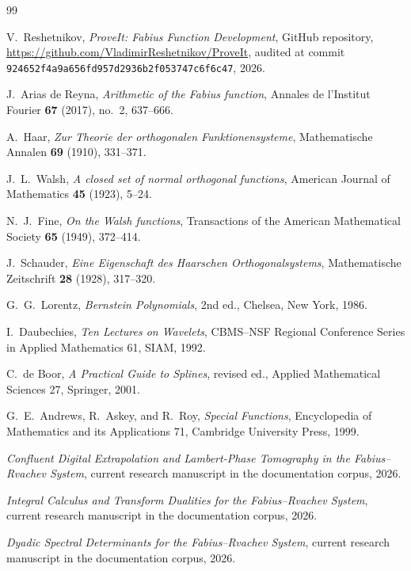 \documentclass[11pt]{article}
\theoremstyle{definition}
\theoremstyle{remark}
\begin{document}
\begin{thebibliography}{99}

V.~Reshetnikov,
\emph{ProveIt: Fabius Function Development}, GitHub repository,
\url{https://github.com/VladimirReshetnikov/ProveIt}, audited at commit
\nolinkurl{924652f4a9a656fd957d2936b2f053747c6f6c47}, 2026.

J.~Arias de Reyna,
\emph{Arithmetic of the Fabius function},
Annales de l'Institut Fourier \textbf{67} (2017), no.~2, 637--666.

A.~Haar,
\emph{Zur Theorie der orthogonalen Funktionensysteme},
Mathematische Annalen \textbf{69} (1910), 331--371.

J.~L.~Walsh,
\emph{A closed set of normal orthogonal functions},
American Journal of Mathematics \textbf{45} (1923), 5--24.

N.~J.~Fine,
\emph{On the Walsh functions},
Transactions of the American Mathematical Society \textbf{65} (1949),
372--414.

J.~Schauder,
\emph{Eine Eigenschaft des Haarschen Orthogonalsystems},
Mathematische Zeitschrift \textbf{28} (1928), 317--320.

G.~G.~Lorentz,
\emph{Bernstein Polynomials}, 2nd ed., Chelsea, New York, 1986.

I.~Daubechies,
\emph{Ten Lectures on Wavelets},
CBMS--NSF Regional Conference Series in Applied Mathematics 61, SIAM, 1992.

C.~de Boor,
\emph{A Practical Guide to Splines}, revised ed.,
Applied Mathematical Sciences 27, Springer, 2001.

G.~E.~Andrews, R.~Askey, and R.~Roy,
\emph{Special Functions}, Encyclopedia of Mathematics and its Applications 71,
Cambridge University Press, 1999.

\emph{Confluent Digital Extrapolation and Lambert-Phase Tomography in the
Fabius--Rvachev System}, current research manuscript in the \repo{} documentation
corpus, 2026.

\emph{Integral Calculus and Transform Dualities for the Fabius--Rvachev
System}, current research manuscript in the \repo{} documentation corpus, 2026.

\emph{Dyadic Spectral Determinants for the Fabius--Rvachev System}, current
research manuscript in the \repo{} documentation corpus, 2026.

\end{thebibliography}
\end{document}

